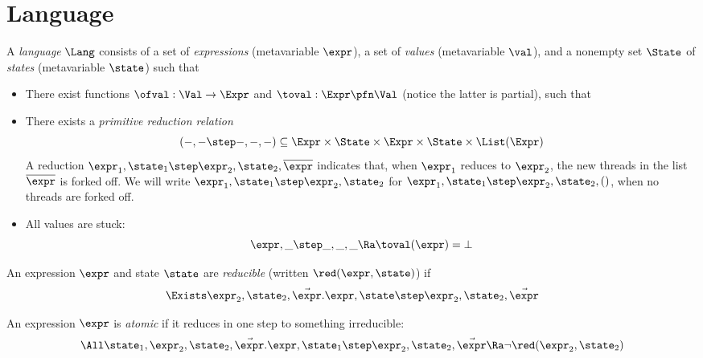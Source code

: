 \section{Language}
\label{sec:language}

A \emph{language} $\Lang$ consists of a set \Expr{} of \emph{expressions} (metavariable $\expr$), a set \Val{} of \emph{values} (metavariable $\val$), and a nonempty set $\State$ of \emph{states} (metavariable $\state$) such that
\begin{itemize}[itemsep=0pt]
\item There exist functions $\ofval : \Val \to \Expr$ and $\toval : \Expr \pfn \Val$ (notice the latter is partial), such that
\item There exists a \emph{primitive reduction relation} \[(-,- \step -,-,-) \subseteq \Expr \times \State \times \Expr \times \State \times \List(\Expr)\]
  A reduction $\expr_1, \state_1 \step \expr_2, \state_2, \overline\expr$ indicates that, when $\expr_1$ reduces to $\expr_2$, the new threads in the list $\overline\expr$ is forked off.
  We will write $\expr_1, \state_1 \step \expr_2, \state_2$ for $\expr_1, \state_1 \step \expr_2, \state_2, ()$, \ie when no threads are forked off. \\
\item All values are stuck:
\[ \expr, \_ \step  \_, \_, \_ \Ra \toval(\expr) = \bot \]
\end{itemize}

\begin{defn}
  An expression $\expr$ and state $\state$ are \emph{reducible} (written $\red(\expr, \state)$) if
  \[ \Exists \expr_2, \state_2, \vec\expr. \expr,\state \step \expr_2,\state_2,\vec\expr \]
\end{defn}

\begin{defn}
  An expression $\expr$ is \emph{atomic} if it reduces in one step to something irreducible:
  \[ \All\state_1, \expr_2, \state_2, \vec\expr. \expr, \state_1 \step \expr_2, \state_2, \vec\expr \Ra \lnot \red(\expr_2, \state_2) \]
\end{defn}

